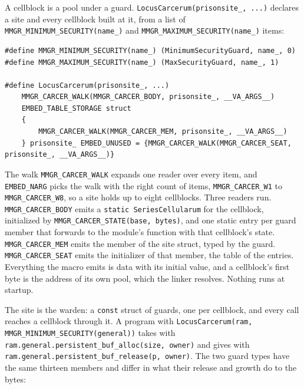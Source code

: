 A cellblock is a pool under a guard. \texttt{Locus\allowbreak{}Carcerum(prisonsite\_\allowbreak{}, .\allowbreak{}.\allowbreak{}.\allowbreak{})} declares a site and every cellblock built at it, from a list of \texttt{MMGR\_\allowbreak{}MINIMUM\_\allowbreak{}SECURITY(name\_\allowbreak{})} and \texttt{MMGR\_\allowbreak{}MAXIMUM\_\allowbreak{}SECURITY(name\_\allowbreak{})} items:

\begin{Verbatim}
#define MMGR_MINIMUM_SECURITY(name_) (MinimumSecurityGuard, name_, 0)
#define MMGR_MAXIMUM_SECURITY(name_) (MaxSecurityGuard, name_, 1)

#define LocusCarcerum(prisonsite_, ...)
    MMGR_CARCER_WALK(MMGR_CARCER_BODY, prisonsite_, __VA_ARGS__)
    EMBED_TABLE_STORAGE struct
    {
        MMGR_CARCER_WALK(MMGR_CARCER_MEM, prisonsite_, __VA_ARGS__)
    } prisonsite_ EMBED_UNUSED = {MMGR_CARCER_WALK(MMGR_CARCER_SEAT, prisonsite_, __VA_ARGS__)}
\end{Verbatim}

The walk \texttt{MMGR\_\allowbreak{}CARCER\_\allowbreak{}WALK} expands one reader over every item, and \texttt{EMBED\_\allowbreak{}NARG} picks the walk with the right count of items, \texttt{MMGR\_\allowbreak{}CARCER\_\allowbreak{}W1} to \texttt{MMGR\_\allowbreak{}CARCER\_\allowbreak{}W8}, so a site holds up to eight cellblocks. Three readers run. \texttt{MMGR\_\allowbreak{}CARCER\_\allowbreak{}BODY} emits a \texttt{static Series\allowbreak{}Cellularum} for the cellblock, initialized by \texttt{MMGR\_\allowbreak{}CARCER\_\allowbreak{}STATE(base, bytes)}, and one static entry per guard member that forwards to the module's function with that cellblock's state. \texttt{MMGR\_\allowbreak{}CARCER\_\allowbreak{}MEM} emits the member of the site struct, typed by the guard. \texttt{MMGR\_\allowbreak{}CARCER\_\allowbreak{}SEAT} emits the initializer of that member, the table of the entries. Everything the macro emits is data with its initial value, and a cellblock's first byte is the address of its own pool, which the linker resolves. Nothing runs at startup.

The site is the warden: a \texttt{const} struct of guards, one per cellblock, and every call reaches a cellblock through it. A program with \texttt{Locus\allowbreak{}Carcerum(ram, MMGR\_\allowbreak{}MINIMUM\_\allowbreak{}SECURITY(general))} takes with \texttt{ram.\allowbreak{}general.\allowbreak{}persistent\_\allowbreak{}buf\_\allowbreak{}alloc(size, owner)} and gives with \texttt{ram.\allowbreak{}general.\allowbreak{}persistent\_\allowbreak{}buf\_\allowbreak{}release(p, owner)}. The two guard types have the same thirteen members and differ in what their release and growth do to the bytes:

